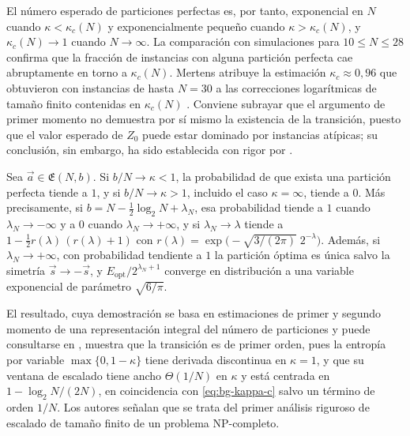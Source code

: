 El número esperado de particiones perfectas es, por tanto, exponencial en $N$ cuando $\kappa<\kappa_c(N)$ y exponencialmente pequeño cuando $\kappa>\kappa_c(N)$, y $\kappa_c(N)\to 1$ cuando $N\to\infty$. La comparación con simulaciones para $10\le N\le 28$ confirma que la fracción de instancias con alguna partición perfecta cae abruptamente en torno a $\kappa_c(N)$. Mertens atribuye la estimación $\kappa_c\approx 0{,}96$ que obtuvieron \textcite{gent1996} con instancias de hasta $N=30$ a las correcciones logarítmicas de tamaño finito contenidas en $\kappa_c(N)$ \parencite{mertens2006}. Conviene subrayar que el argumento de primer momento no demuestra por sí mismo la existencia de la transición, puesto que el valor esperado de $Z_0$ puede estar dominado por instancias atípicas; su conclusión, sin embargo, ha sido establecida con rigor por \textcite{borgs2001}.

\begin{theorem}\label{thm:bcp}
Sea $\vec{a} \in \mathfrak{E}(N,b)$. Si $b/N \to \kappa < 1$, la probabilidad de que exista una partición perfecta tiende a $1$, y si $b/N \to \kappa > 1$, incluido el caso $\kappa = \infty$, tiende a $0$. Más precisamente, si $b = N - \tfrac{1}{2}\log_2 N + \lambda_N$, esa probabilidad tiende a $1$ cuando $\lambda_N \to -\infty$ y a $0$ cuando $\lambda_N \to +\infty$, y si $\lambda_N \to \lambda$ tiende a $1 - \tfrac{1}{2} r(\lambda)\,(r(\lambda) + 1)$ con $r(\lambda) = \exp\bigl(-\sqrt{3/(2\pi)}\; 2^{-\lambda}\bigr)$. Además, si $\lambda_N \to +\infty$, con probabilidad tendiente a $1$ la partición óptima es única salvo la simetría $\vec{s} \to -\vec{s}$, y $E_{\mathrm{opt}}/2^{\lambda_N + 1}$ converge en distribución a una variable exponencial de parámetro $\sqrt{6/\pi}$.
\end{theorem}

El resultado, cuya demostración se basa en estimaciones de primer y segundo momento de una representación integral del número de particiones y puede consultarse en \textcite{borgs2001}, muestra que la transición es de primer orden, pues la entropía por variable $\max\{0, 1 - \kappa\}$ tiene derivada discontinua en $\kappa = 1$, y que su ventana de escalado tiene ancho $\Theta(1/N)$ en $\kappa$ y está centrada en $1 - \log_2 N/(2N)$, en coincidencia con \eqref{eq:bg-kappa-c} salvo un término de orden $1/N$. Los autores señalan que se trata del primer análisis riguroso de escalado de tamaño finito de un problema NP-completo.

